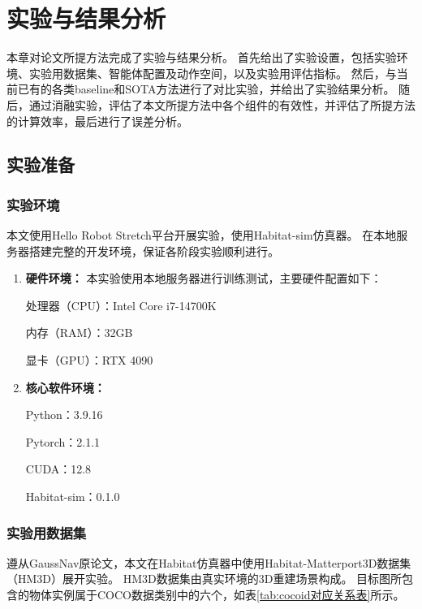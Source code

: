 \chapter{实验与结果分析}

本章对论文所提方法完成了实验与结果分析。
首先给出了实验设置，包括实验环境、实验用数据集、智能体配置及动作空间，以及实验用评估指标。
然后，与当前已有的各类baseline和SOTA方法进行了对比实验，并给出了实验结果分析。
随后，通过消融实验，评估了本文所提方法中各个组件的有效性，并评估了所提方法的计算效率，最后进行了误差分析。

\section{实验准备}
\subsection{实验环境}
本文使用Hello Robot Stretch平台\cite{hello_robot_stretch_2}开展实验，使用Habitat-sim仿真器\cite{habitat-sim}。
在本地服务器搭建完整的开发环境，保证各阶段实验顺利进行。
\begin{enumerate}
    \item \textbf{硬件环境：}
    本实验使用本地服务器进行训练测试，主要硬件配置如下：
    
    处理器（CPU）：Intel Core i7-14700K
    
    内存（RAM）：32GB
    
    显卡（GPU）：RTX 4090

    \item \textbf{核心软件环境：}
    
    Python：3.9.16

    Pytorch：2.1.1

    CUDA：12.8

    Habitat-sim：0.1.0

\end{enumerate}

\subsection{实验用数据集}
遵从GaussNav原论文，本文在Habitat仿真器\cite{habitat-sim}中使用Habitat-Matterport3D数据集（HM3D）\cite{HM3D}展开实验。
HM3D数据集由真实环境的3D重建场景构成。
目标图所包含的物体实例属于COCO数据类别中的六个，如表\ref{tab:cocoid对应关系表}所示。



